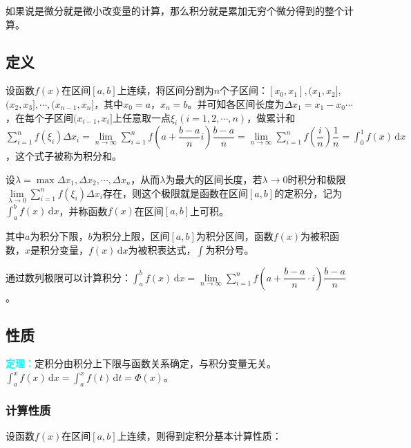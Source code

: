 \documentclass[UTF8, 12pt]{ctexart}
\begin{document}
如果说是微分就是微小改变量的计算，那么积分就是累加无穷个微分得到的整个计算。

\subsection{定义}

设函数$f(x)$在区间$[a,b]$上连续，将区间分割为$n$个子区间：$[x_0,x_1],(x_1,x_2],$\\$(x_2,x_3],\cdots,(x_{n-1},x_n]$，其中$x_0=a$，$x_n=b$。并可知各区间长度为$\Delta x_1=x_1-x_0\cdots$，在每个子区间$(x_{i-1},x_i]$上任意取一点$\xi_i(i=1,2,\cdots,n)$，做累计和$\sum\limits_{i=1}^nf(\xi_i)\Delta x_i=\lim\limits_{n\to\infty}\sum\limits_{i=1}^nf(a+\dfrac{b-a}{n}i)\dfrac{b-a}{n}=\lim\limits_{n\to\infty}\sum\limits_{i=1}^nf(\dfrac{i}{n})\dfrac{1}{n}=\int_0^1f(x)\,\textrm{d}x$，这个式子被称为积分和。

设$\lambda=\max{\Delta x_1,\Delta x_2,\cdots,\Delta x_n}$，从而$\lambda$为最大的区间长度，若$\lambda\to 0$时积分和极限$\lim\limits_{\lambda\to 0}\sum\limits_{i=1}^nf(\xi_i)\Delta x_i$存在，则这个极限就是函数在区间$[a,b]$的定积分，记为$\int_a^bf(x)\,\textrm{d}x$，并称函数$f(x)$在区间$[a,b]$上可积。

其中$a$为积分下限，$b$为积分上限，区间$[a,b]$为积分区间，函数$f(x)$为被积函数，$x$是积分变量，$f(x)\,\textrm{d}x$为被积表达式，$\int$为积分号。\medskip

通过数列极限可以计算积分：$\displaystyle{\int_a^bf(x)\,\textrm{d}x=\lim\limits_{n\to\infty}\sum\limits_{i=1}^nf\left(a+\dfrac{b-a}{n}\cdot i\right)\dfrac{b-a}{n}}$。

\subsection{性质}

\textcolor{aqua}{\textbf{定理：}}定积分由积分上下限与函数关系确定，与积分变量无关。$\int_a^xf(x)\,\textrm{d}x=\int_a^xf(t)\,\textrm{d}t=\varPhi(x)$。

\subsubsection{计算性质}

设函数$f(x)$在区间$[a,b]$上连续，则得到定积分基本计算性质：
\end{document}

